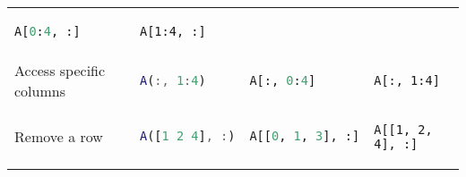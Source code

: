 \documentclass[10pt, landscape]{article}
\begin{document}
\begin{multicols}{2}
\begin{tabular}[]{@{}llll@{}}
\begin{minipage}[t]{0.23\columnwidth}
\begin{lstlisting}[language=Python]
A[0:4, :]
\end{lstlisting}
\strut
\end{minipage} & \begin{minipage}[t]{0.20\columnwidth}\raggedright\strut
\begin{lstlisting}
A[1:4, :]
\end{lstlisting}
\strut
\end{minipage}\tabularnewline
\begin{minipage}[t]{0.23\columnwidth}\raggedright\strut
Access specific columns\strut
\end{minipage} & \begin{minipage}[t]{0.23\columnwidth}\raggedright\strut
\begin{lstlisting}[language=Matlab]
A(:, 1:4)
\end{lstlisting}
\strut
\end{minipage} & \begin{minipage}[t]{0.23\columnwidth}\raggedright\strut
\begin{lstlisting}[language=Python]
A[:, 0:4]
\end{lstlisting}
\strut
\end{minipage} & \begin{minipage}[t]{0.20\columnwidth}\raggedright\strut
\begin{lstlisting}
A[:, 1:4]
\end{lstlisting}
\strut
\end{minipage}\tabularnewline
\begin{minipage}[t]{0.23\columnwidth}\raggedright\strut
Remove a row\strut
\end{minipage} & \begin{minipage}[t]{0.23\columnwidth}\raggedright\strut
\begin{lstlisting}[language=Matlab]
A([1 2 4], :)
\end{lstlisting}
\strut
\end{minipage} & \begin{minipage}[t]{0.23\columnwidth}\raggedright\strut
\begin{lstlisting}[language=Python]
A[[0, 1, 3], :]
\end{lstlisting}
\strut
\end{minipage} & \begin{minipage}[t]{0.20\columnwidth}\raggedright\strut
\begin{lstlisting}
A[[1, 2, 4], :]
\end{lstlisting}

\end{minipage}
\end{tabular}
\end{multicols}
\end{document}
